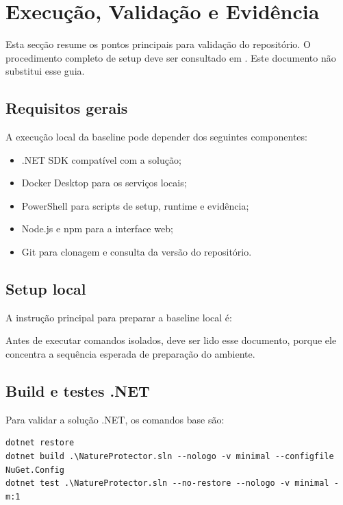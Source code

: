 \section{Execução, Validação e Evidência}

Esta secção resume os pontos principais para validação do repositório. O procedimento completo de setup deve ser consultado em . Este documento não substitui esse guia.

\subsection{Requisitos gerais}

A execução local da baseline pode depender dos seguintes componentes:

\begin{itemize}
    \item .NET SDK compatível com a solução;
    \item Docker Desktop para os serviços locais;
    \item PowerShell para scripts de setup, runtime e evidência;
    \item Node.js e npm para a interface web;
    \item Git para clonagem e consulta da versão do repositório.
\end{itemize}

\subsection{Setup local}

A instrução principal para preparar a baseline local é:

\begin{center}
\end{center}

Antes de executar comandos isolados, deve ser lido esse documento, porque ele concentra a sequência esperada de preparação do ambiente.

\subsection{Build e testes .NET}

Para validar a solução .NET, os comandos base são:

\begin{verbatim}
dotnet restore
dotnet build .\NatureProtector.sln --nologo -v minimal --configfile NuGet.Config
dotnet test .\NatureProtector.sln --no-restore --nologo -v minimal -m:1
\end{verbatim}

